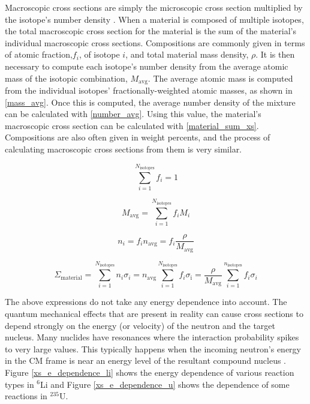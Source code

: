 Macroscopic cross sections are simply the microscopic cross section multiplied by the isotope's number density \cite{duderstadt}.  When a material is composed of multiple isotopes, the total macroscopic cross section for the material is the sum of the material's individual macroscopic cross sections.  Compositions are commonly given in terms of atomic fraction,$f_i$, of isotope $i$, and total material mass density, $\rho$.  It is then necessary to compute each isotope's number density from the average atomic mass of the isotopic combination, $M_\mathrm{avg}$.  The average atomic mass is computed from the individual isotopes' fractionally-weighted atomic masses, as shown in \eqref{mass_avg}.  Once this is computed, the average number density of the mixture can be calculated with \eqref{number_avg}.  Using this value, the material's macroscopic cross section can be calculated with \eqref{material_sum_xs}.  Compositions are also often given in weight percents, and the process of calculating macroscopic cross sections from them is very similar.

\begin{equation}
\sum_{i=1}^{N_\mathrm{isotopes}} f_i =1
\label{fraction_norm}
\end{equation}

\begin{equation}
M_\mathrm{avg} = \sum_{i=1}^{N_\mathrm{isotopes}} f_i M_i
\label{mass_avg}
\end{equation}

\begin{equation}
n_i = f_i n_\mathrm{avg} = f_i \frac{\rho}{M_\mathrm{avg}}
\label{number_avg}
\end{equation}

\begin{equation}
\Sigma_{\mathrm{material}} = \sum_{i=1}^{N_\mathrm{isotopes}} n_i \sigma_i = n_\mathrm{avg} \sum_{i=1}^{N_\mathrm{isotopes}} f_i \sigma_\mathrm{i} = \frac{\rho}{M_\mathrm{avg}} \sum_{i=1}^{n_\mathrm{isotopes}} f_i \sigma_i 
\label{material_sum_xs}
\end{equation}

The above expressions do not take any energy dependence into account. The quantum mechanical effects that are present in reality can cause cross sections to depend strongly on the energy (or velocity) of the neutron and the target nucleus.  Many nuclides have resonances where the interaction probability spikes to very large values.  This typically happens when the incoming neutron's energy in the CM frame is near an energy level of the resultant compound nucleus \cite{duderstadt}.   Figure \ref{xs_e_dependence_li} shows the energy dependence of various reaction types in $^6$Li and Figure \ref{xs_e_dependence_u} shows the dependence of some reactions in $^{235}$U.  

